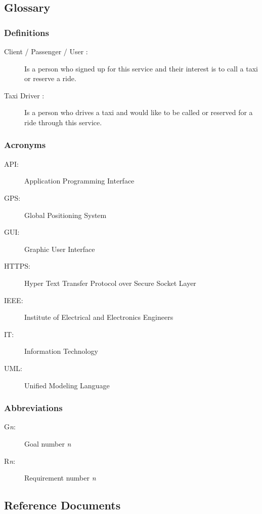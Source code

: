 \documentclass[a4paper]{article}
\begin{document}
\subsection{Glossary}
\subsubsection{Definitions}

\begin{description}
\item[Client / Passenger / User :] Is a person who signed up for this service and their interest is to call a taxi or reserve  a ride.
\item[Taxi Driver :] Is a person who drives a taxi and would like to be called or reserved for a ride through this service.
\end{description}

\subsubsection{Acronyms}

\begin{description}
\item[API:] Application Programming Interface
\item[GPS:] Global Positioning System
\item[GUI:] Graphic User Interface
\item[HTTPS:] Hyper Text Transfer Protocol over Secure Socket Layer
\item[IEEE:] Institute of Electrical and Electronics Engineers
\item[IT:] Information Technology
\item[UML:] Unified Modeling Language
\end{description}

\subsubsection{Abbreviations}

\begin{description}
\item[G\emph{n}:] Goal number \emph{n}
\item[R\emph{n}:] Requirement number \emph{n}
\end{description}

\subsection{Reference Documents}
\end{document}
